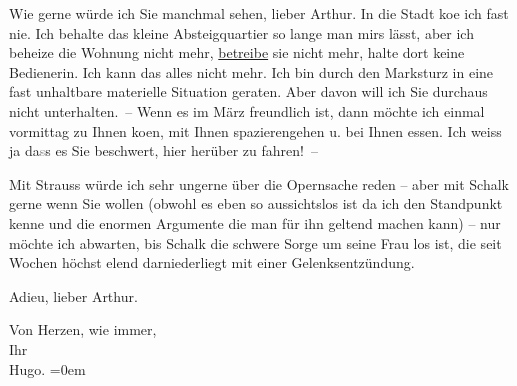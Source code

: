 \pstart
           Wie gerne würde ich Sie manchmal sehen, lieber Arthur. In die Stadt ko{\geminationm}e ich fast nie. Ich behalte das kleine Absteigquartier
               so lange man mirs lässt, aber ich beheize die Wohnung nicht mehr, \uline{betreibe} sie nicht mehr, halte dort keine Bedienerin. Ich
               kann das alles nicht mehr. Ich bin durch den Marksturz in eine fast unhaltbare
               materielle Situation geraten. Aber davon will {\pb}ich Sie durchaus nicht
               unterhalten. – Wenn es im März freundlich ist, dann möchte ich einmal
               vormittag zu Ihnen ko{\geminationm}en, mit Ihnen spazierengehen u.
               bei Ihnen essen. Ich weiss ja da\textcolor{gray}{s}s es Sie beschwert, hier herüber
               zu fahren! –\pend
           
\pstart
           Mit Strauss würde ich sehr ungerne über die
                  Opernsache reden – aber mit
                  Schalk gerne wenn Sie wollen (obwohl es
               eben so aussichtslos ist da ich den Standpunkt kenne und die enormen Argumente die
               man für ihn geltend machen kann) – nur möchte ich abwarten, bis Schalk die schwere Sorge um seine Frau los ist, die seit Wochen höchst elend
               darniederliegt mit einer Gelenksentzündung.\pend
           
\pstart
           Adieu, lieber Arthur.\pend
           
\pstart
           Von Herzen, wie immer,{\\[\baselineskip]}Ihr{\\[\baselineskip]}\spacefill\mbox{Hugo.}\pend
           \leftskip=0em{}\endnumbering{}  \newcommand{\dateiname}{L02396}\newcommand{\titel}{Hugo Hofmannsthal an Arthur Schnitzler, 16. 1. 1923}\newcommand{\editorInnen}{Martin Anton Müller und Gerd-Hermann Susen}
